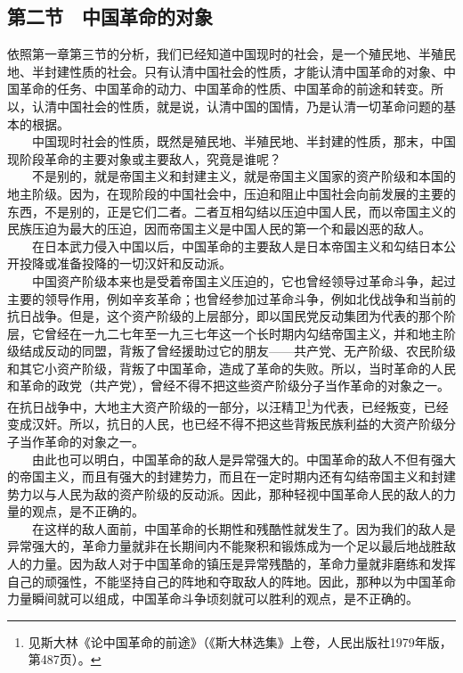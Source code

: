 \documentclass[cn,11pt,chinese]{elegantbook}
\def\myformat#1{\hfil\hfil #1}
\begin{document}
\subsection*{\myformat{第二节　中国革命的对象}}
依照第一章第三节的分析，我们已经知道中国现时的社会，是一个殖民地、半殖民地、半封建性质的社会。只有认清中国社会的性质，才能认清中国革命的对象、中国革命的任务、中国革命的动力、中国革命的性质、中国革命的前途和转变。所以，认清中国社会的性质，就是说，认清中国的国情，乃是认清一切革命问题的基本的根据。\\
　　中国现时社会的性质，既然是殖民地、半殖民地、半封建的性质，那末，中国现阶段革命的主要对象或主要敌人，究竟是谁呢？\\
　　不是别的，就是帝国主义和封建主义，就是帝国主义国家的资产阶级和本国的地主阶级。因为，在现阶段的中国社会中，压迫和阻止中国社会向前发展的主要的东西，不是别的，正是它们二者。二者互相勾结以压迫中国人民，而以帝国主义的民族压迫为最大的压迫，因而帝国主义是中国人民的第一个和最凶恶的敌人。\\
　　在日本武力侵入中国以后，中国革命的主要敌人是日本帝国主义和勾结日本公开投降或准备投降的一切汉奸和反动派。\\
　　中国资产阶级本来也是受着帝国主义压迫的，它也曾经领导过革命斗争，起过主要的领导作用，例如辛亥革命；也曾经参加过革命斗争，例如北伐战争和当前的抗日战争。但是，这个资产阶级的上层部分，即以国民党反动集团为代表的那个阶层，它曾经在一九二七年至一九三七年这一个长时期内勾结帝国主义，并和地主阶级结成反动的同盟，背叛了曾经援助过它的朋友——共产党、无产阶级、农民阶级和其它小资产阶级，背叛了中国革命，造成了革命的失败。所以，当时革命的人民和革命的政党（共产党），曾经不得不把这些资产阶级分子当作革命的对象之一。在抗日战争中，大地主大资产阶级的一部分，以汪精卫\footnote[32]{ 见斯大林《论中国革命的前途》（《斯大林选集》上卷，人民出版社1979年版，第487页）。}为代表，已经叛变，已经变成汉奸。所以，抗日的人民，也已经不得不把这些背叛民族利益的大资产阶级分子当作革命的对象之一。\\
　　由此也可以明白，中国革命的敌人是异常强大的。中国革命的敌人不但有强大的帝国主义，而且有强大的封建势力，而且在一定时期内还有勾结帝国主义和封建势力以与人民为敌的资产阶级的反动派。因此，那种轻视中国革命人民的敌人的力量的观点，是不正确的。\\
　　在这样的敌人面前，中国革命的长期性和残酷性就发生了。因为我们的敌人是异常强大的，革命力量就非在长期间内不能聚积和锻炼成为一个足以最后地战胜敌人的力量。因为敌人对于中国革命的镇压是异常残酷的，革命力量就非磨练和发挥自己的顽强性，不能坚持自己的阵地和夺取敌人的阵地。因此，那种以为中国革命力量瞬间就可以组成，中国革命斗争顷刻就可以胜利的观点，是不正确的。\\
\end{document}
